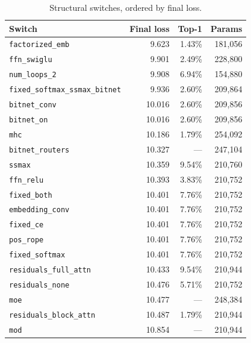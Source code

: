 \begin{table}[H]
\centering
\small
\caption{Structural switches, ordered by final loss.}
\label{tab:r2-trans}
\begin{tabular}{lrrr}
\toprule
Switch & Final loss & Top-1 & Params \\
\midrule
\texttt{factorized\_emb}          & 9.623  & 1.43\% & 181{,}056 \\
\texttt{ffn\_swiglu}              & 9.901  & 2.49\% & 228{,}800 \\
\texttt{num\_loops\_2}            & 9.908  & 6.94\% & 154{,}880 \\
\texttt{fixed\_softmax\_ssmax\_bitnet} & 9.936 & 2.60\% & 209{,}864 \\
\texttt{bitnet\_conv}             & 10.016 & 2.60\% & 209{,}856 \\
\texttt{bitnet\_on}               & 10.016 & 2.60\% & 209{,}856 \\
\texttt{mhc}                      & 10.186 & 1.79\% & 254{,}092 \\
\texttt{bitnet\_routers}          & 10.327 & ---    & 247{,}104 \\
\texttt{ssmax}                    & 10.359 & 9.54\% & 210{,}760 \\
\texttt{ffn\_relu}                & 10.393 & 3.83\% & 210{,}752 \\
\texttt{fixed\_both}              & 10.401 & 7.76\% & 210{,}752 \\
\texttt{embedding\_conv}          & 10.401 & 7.76\% & 210{,}752 \\
\texttt{fixed\_ce}                & 10.401 & 7.76\% & 210{,}752 \\
\texttt{pos\_rope}                & 10.401 & 7.76\% & 210{,}752 \\
\texttt{fixed\_softmax}           & 10.401 & 7.76\% & 210{,}752 \\
\texttt{residuals\_full\_attn}    & 10.433 & 9.54\% & 210{,}944 \\
\texttt{residuals\_none}          & 10.476 & 5.71\% & 210{,}752 \\
\texttt{moe}                      & 10.477 & ---    & 248{,}384 \\
\texttt{residuals\_block\_attn}   & 10.487 & 1.79\% & 210{,}944 \\
\texttt{mod}                      & 10.854 & --- & 210{,}944 \\
\bottomrule
\end{tabular}
\end{table}

